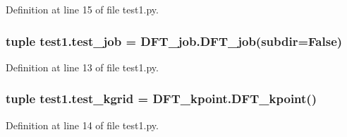 Definition at line 15 of file test1.\+py.

\hypertarget{namespacetest1_aa1e1b8819257d38e312705aea54b74f0}{
\subsubsection[{test\+\_\+job}]{\setlength{\rightskip}{0pt plus 5cm}tuple test1.\+test\+\_\+job = D\+F\+T\+\_\+job.\+D\+F\+T\+\_\+job(subdir=False)}}\label{namespacetest1_aa1e1b8819257d38e312705aea54b74f0}


Definition at line 13 of file test1.\+py.

\hypertarget{namespacetest1_a53b8fef5f47cd9bf5328eeb3c19dfb48}{
\subsubsection[{test\+\_\+kgrid}]{\setlength{\rightskip}{0pt plus 5cm}tuple test1.\+test\+\_\+kgrid = D\+F\+T\+\_\+kpoint.\+D\+F\+T\+\_\+kpoint()}}\label{namespacetest1_a53b8fef5f47cd9bf5328eeb3c19dfb48}


Definition at line 14 of file test1.\+py.

